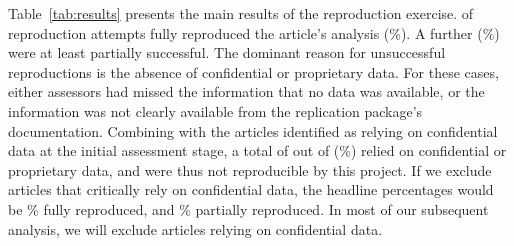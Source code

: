 %
Table~\ref{tab:results} presents the main results of the reproduction exercise.  of  reproduction attempts fully reproduced the article's analysis (\%). 
A further  (\%) were at least partially successful.
%
The dominant reason for unsuccessful reproductions is the absence of  confidential or proprietary data. For these  cases, either assessors had missed the information that no data was available, or the information was not clearly available from the replication package's documentation. 
Combining with the  articles identified as relying on confidential data at the initial assessment stage, a total of  out of  (\%) relied on confidential or proprietary data, and were thus not reproducible by this project. If we exclude articles that critically rely on confidential data, the headline percentages would be \% fully reproduced, and \% partially reproduced. In most of our subsequent analysis, we will exclude  articles relying on confidential data.
\FloatBarrier




